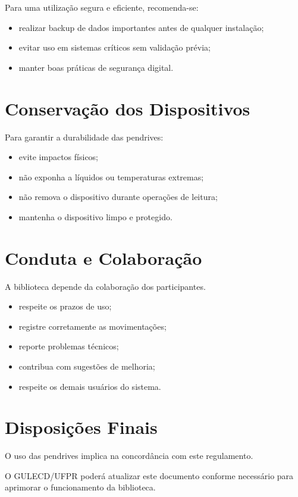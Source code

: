 \documentclass[12pt,a4paper]{article}
\begin{document}
Para uma utilização segura e eficiente, recomenda-se:

\begin{itemize}
    \item realizar backup de dados importantes antes de qualquer instalação;
    \item evitar uso em sistemas críticos sem validação prévia;
    \item manter boas práticas de segurança digital.
\end{itemize}

\section{Conservação dos Dispositivos}

Para garantir a durabilidade das pendrives:

\begin{itemize}
    \item evite impactos físicos;
    \item não exponha a líquidos ou temperaturas extremas;
    \item não remova o dispositivo durante operações de leitura;
    \item mantenha o dispositivo limpo e protegido.
\end{itemize}

\section{Conduta e Colaboração}

A biblioteca depende da colaboração dos participantes.

\begin{itemize}
    \item respeite os prazos de uso;
    \item registre corretamente as movimentações;
    \item reporte problemas técnicos;
    \item contribua com sugestões de melhoria;
    \item respeite os demais usuários do sistema.
\end{itemize}

\section{Disposições Finais}

O uso das pendrives implica na concordância com este regulamento.

O GULECD/UFPR poderá atualizar este documento conforme necessário para aprimorar o funcionamento da biblioteca.
\end{document}
